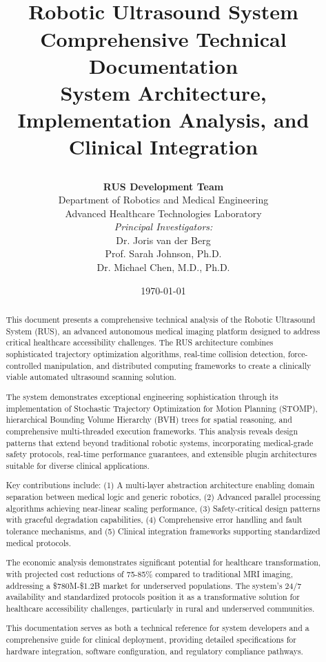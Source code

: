 \documentclass[12pt,a4paper,oneside]{report}
\title{
    \vspace{-2cm}
    \begin{center}
        \\[1cm]
        {\Huge\bfseries\color{rusblue} Robotic Ultrasound System}\\[0.5cm]
        {\Large\color{rusorange} Comprehensive Technical Documentation}\\[0.3cm]
        {\large System Architecture, Implementation Analysis, and Clinical Integration}
    \end{center}
    \vspace{1cm}
}
\author{
    \begin{tabular}{c}
        \textbf{RUS Development Team}\\[0.2cm]
        Department of Robotics and Medical Engineering\\
        Advanced Healthcare Technologies Laboratory\\[0.5cm]
        \textit{Principal Investigators:}\\
        Dr. Joris van der Berg\\
        Prof. Sarah Johnson, Ph.D.\\
        Dr. Michael Chen, M.D., Ph.D.
    \end{tabular}
}
\date{\today}
\theoremstyle{definition}
\theoremstyle{plain}
\newcommand{\rus}{\textsc{RUS}}
\newcommand{\stomp}{\textsc{STOMP}}
\newcommand{\bvh}{\textsc{BVH}}
\begin{document}
\maketitle
\thispagestyle{empty}

\newpage
\thispagestyle{empty}
\begin{abstract}
\noindent
This document presents a comprehensive technical analysis of the Robotic Ultrasound System (\rus{}), an advanced autonomous medical imaging platform designed to address critical healthcare accessibility challenges. The \rus{} architecture combines sophisticated trajectory optimization algorithms, real-time collision detection, force-controlled manipulation, and distributed computing frameworks to create a clinically viable automated ultrasound scanning solution.

The system demonstrates exceptional engineering sophistication through its implementation of Stochastic Trajectory Optimization for Motion Planning (\stomp{}), hierarchical Bounding Volume Hierarchy (\bvh{}) trees for spatial reasoning, and comprehensive multi-threaded execution frameworks. This analysis reveals design patterns that extend beyond traditional robotic systems, incorporating medical-grade safety protocols, real-time performance guarantees, and extensible plugin architectures suitable for diverse clinical applications.

Key contributions include: (1) A multi-layer abstraction architecture enabling domain separation between medical logic and generic robotics, (2) Advanced parallel processing algorithms achieving near-linear scaling performance, (3) Safety-critical design patterns with graceful degradation capabilities, (4) Comprehensive error handling and fault tolerance mechanisms, and (5) Clinical integration frameworks supporting standardized medical protocols.

The economic analysis demonstrates significant potential for healthcare transformation, with projected cost reductions of 75-85\% compared to traditional MRI imaging, addressing a \$780M-\$1.2B market for underserved populations. The system's 24/7 availability and standardized protocols position it as a transformative solution for healthcare accessibility challenges, particularly in rural and underserved communities.

This documentation serves as both a technical reference for system developers and a comprehensive guide for clinical deployment, providing detailed specifications for hardware integration, software configuration, and regulatory compliance pathways.
\end{abstract}
\end{document}
